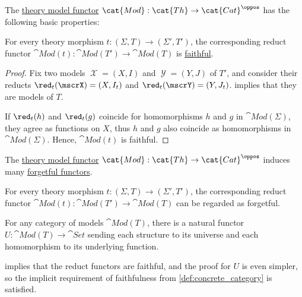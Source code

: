 \begin{proposition}\label{thm:def:fol_theory_model_functor}
  The \hyperref[def:fol_theory_model_functor]{theory model functor} \( \cat{Mod}: \cat{Th} \to \cat{Cat}^\oppos \) has the following basic properties:
  \begin{thmenum}
     For every theory morphism \( t: (\Sigma, T) \to (\Sigma', T') \), the corresponding reduct functor \( \cat{Mod}(t): \cat{Mod}(T') \to \cat{Mod}(T) \) is \hyperref[def:functor_invertibility/faithful]{faithful}.
  \end{thmenum}
\end{proposition}
\begin{proof}
   Fix two models \( \mscrX = (X, I) \) and \( \mscrY = (Y, J) \) of \( T' \), and consider their reducts \( \red_t(\mscrX) = (X, I_t) \) and \( \red_t(\mscrY) = (Y, J_t) \).  implies that they are models of \( T \).

  If \( \red_t(h) \) and \( \red_t(g) \) coincide for homomorphisms \( h \) and \( g \) in \( \cat{Mod}(\Sigma) \), they agree as functions on \( X \), thus \( h \) and \( g \) also coincide as homomorphisms in \( \cat{Mod}(\Sigma) \). Hence, \( \cat{Mod}(t) \) is faithful.
\end{proof}

\begin{definition}\label{def:fol_theory_forgetful_functor}\mimprovised
  The \hyperref[def:fol_theory_model_functor/obj]{theory model functor} \( \cat{Mod}: \cat{Th} \to \cat{Cat}^\oppos \) induces many \hyperref[con:forgetful_functor]{forgetful functors}.

  \begin{thmenum}
     For every theory morphism \( t: (\Sigma, T) \to (\Sigma', T') \), the corresponding reduct functor \( \cat{Mod}(t): \cat{Mod}(T') \to \cat{Mod}(T) \) can be regarded as forgetful.

     For any category of models \( \cat{Mod}(T) \), there is a natural functor \( U: \cat{Mod}(T) \to \cat{Set} \) sending each structure to its universe and each homomorphism to its underlying function.
  \end{thmenum}
\end{definition}
\begin{defproof}
   implies that the reduct functors are faithful, and the proof for \( U \) is even simpler, so the implicit requirement of faithfulness from \cref{def:concrete_category} is satisfied.
\end{defproof}

